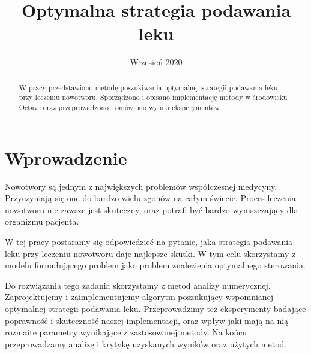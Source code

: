 \documentclass[licencjacka]{pracamgr}
\title{Optymalna strategia podawania leku}
\date{Wrzesień 2020}
\begin{document}
\maketitle

\begin{abstract}
  W pracy przedstawiono metodę poszukiwania optymalnej strategii podawania leku przy leczeniu nowotworu.
  Sporządzono i opisano implementację metody w środowisku Octave oraz przeprowadzono i omówiono wyniki eksperymentów.
\end{abstract}

\tableofcontents

\chapter*{Wprowadzenie}

Nowotwory są jednym z największych problemów współczesnej medycyny. Przyczyniają się one do bardzo wielu zgonów na całym świecie. Proces leczenia nowotworu nie zawsze jest skuteczny, oraz potrafi być bardzo wyniszczający dla organizmu pacjenta.

W tej pracy postaramy się odpowiedzieć na pytanie, jaka strategia podawania leku przy leczeniu nowotworu daje najlepsze skutki. W tym celu skorzystamy z modelu formułującego problem jako problem znalezienia optymalnego sterowania.

Do rozwiązania tego zadania skorzystamy z metod analizy numerycznej. Zaprojektujemy i zaimplementujemy algorytm poszukujący wspomnianej optymalnej strategii podawania leku. Przeprowadzimy też eksperymenty badające poprawność i skuteczność naszej implementacji, oraz wpływ jaki mają na nią rozmaite parametry wynikające z zastosowanej metody. Na końcu przeprowadzamy analizę i krytykę uzyskanych wyników oraz użytych metod.
\end{document}
